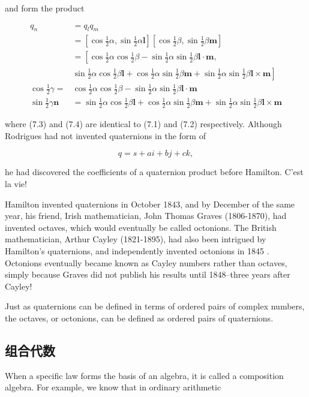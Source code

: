 and form the product

$$
\begin{aligned}
q_{n} & =q_{l} q_{m} \\
& =\left[\cos \frac{1}{2} \alpha, \sin \frac{1}{2} \alpha \mathbf{l}\right]\left[\cos \frac{1}{2} \beta, \sin \frac{1}{2} \beta \mathbf{m}\right] \\
& =\left[\cos \frac{1}{2} \alpha \cos \frac{1}{2} \beta-\sin \frac{1}{2} \alpha \sin \frac{1}{2} \beta \mathbf{l} \cdot \mathbf{m},\right. \\
& \left.\sin \frac{1}{2} \alpha \cos \frac{1}{2} \beta \mathbf{l}+\cos \frac{1}{2} \alpha \sin \frac{1}{2} \beta \mathbf{m}+\sin \frac{1}{2} \alpha \sin \frac{1}{2} \beta \mathbf{l} \times \mathbf{m}\right] \\
\cos \frac{1}{2} \gamma= & \cos \frac{1}{2} \alpha \cos \frac{1}{2} \beta-\sin \frac{1}{2} \alpha \sin \frac{1}{2} \beta \mathbf{l} \cdot \mathbf{m} \\
\sin \frac{1}{2} \gamma \mathbf{n} & =\sin \frac{1}{2} \alpha \cos \frac{1}{2} \beta \mathbf{l}+\cos \frac{1}{2} \alpha \sin \frac{1}{2} \beta \mathbf{m}+\sin \frac{1}{2} \alpha \sin \frac{1}{2} \beta \mathbf{l} \times \mathbf{m}
\end{aligned}
$$

where (7.3) and (7.4) are identical to (7.1) and (7.2) respectively. Although Rodrigues had not invented quaternions in the form of

$$
q=s+a i+b j+c k,
$$

he had discovered the coefficients of a quaternion product before Hamilton. C'est la vie!

Hamilton invented quaternions in October 1843, and by December of the same year, his friend, Irish mathematician, John Thomas Graves (1806-1870), had invented octaves, which would eventually be called octonions. The British mathematician, Arthur Cayley (1821-1895), had also been intrigued by Hamilton's quaternions, and independently invented octonions in 1845 . Octonions eventually became known as Cayley numbers rather than octaves, simply because Graves did not publish his results until 1848–three years after Cayley!

Just as quaternions can be defined in terms of ordered pairs of complex numbers, the octaves, or octonions, can be defined as ordered pairs of quaternions.

\subsection{组合代数}
When a specific law forms the basis of an algebra, it is called a composition algebra. For example, we know that in ordinary arithmetic

